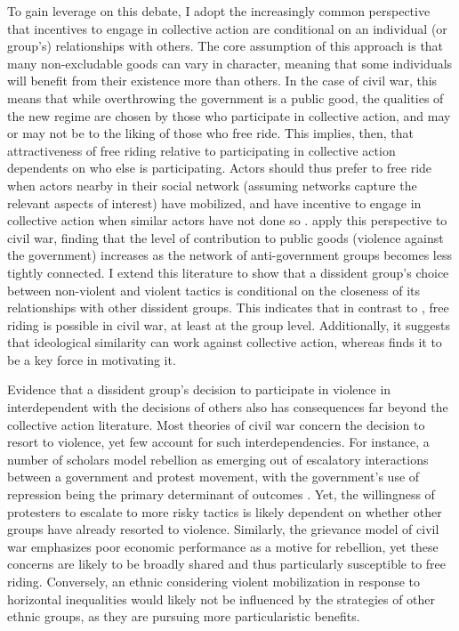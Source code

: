 To gain leverage on this debate, I adopt the increasingly common perspective that incentives to engage in collective action are conditional on an individual (or group's) relationships with others. The core assumption of this approach is that  many non-excludable goods can vary in character, meaning that some individuals will benefit from their existence more than others. In the case of civil war, this means that while overthrowing the government is a public good, the qualities of the new regime are chosen by those who participate in collective action, and may or may not be to the liking of those who free ride. This implies, then, that attractiveness of free riding relative to participating in collective action dependents on who else is participating. Actors should thus prefer to free ride when actors nearby in their social network (assuming networks capture the relevant aspects of interest) have mobilized, and have incentive to engage in collective action when similar actors have not done so \citep{Bramoulle2007}. \citet{Metternich2013} apply this perspective to civil war, finding that the level of contribution to public goods (violence against the government) increases as the network of anti-government groups becomes less tightly connected. I extend this literature to show that a dissident group's choice between non-violent and violent tactics is conditional on the closeness of its relationships with other dissident groups. This indicates that in contrast to \citet{Kalyvas2014}, free riding is possible in civil war, at least at the group level. Additionally, it suggests that ideological similarity can work against collective action, whereas \citet{Wood2003} finds it to be a key force in motivating it.

Evidence that a dissident group's decision to participate in violence in interdependent with the decisions of others also has consequences far beyond the collective action literature. Most theories of civil war concern the decision to resort to violence, yet few account for such interdependencies. For instance, a number of scholars model rebellion as emerging out of escalatory interactions between a government and protest movement, with the government's use of repression being the primary determinant of outcomes \citep[e.g.][]{Lichbach1987,Moore1998}. Yet, the willingness of protesters to escalate to more risky tactics is likely dependent on whether other groups have already resorted to violence. Similarly, the grievance model of civil war \citep{Collier2004} emphasizes poor economic performance as a motive for rebellion, yet these concerns are likely to be broadly shared and thus particularly susceptible to free riding. Conversely, an ethnic considering violent mobilization in response to horizontal inequalities \citep[see][]{gurr70,Cederman2010} would likely not be influenced by the strategies of other ethnic groups, as they are pursuing more particularistic benefits.

